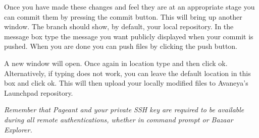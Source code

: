 Once you have made these changes and feel they are at an appropriate stage you can commit them by pressing the commit button. This will bring up another window. The branch should show, by default, your local repository. In the message box type the message you want publicly displayed when your commit is pushed. When you are done you can push files by clicking the push button.

A new window will open. Once again in location type  and then click ok. Alternatively, if typing  does not work, you can leave the default location in this box and click ok. This will then upload your locally modified files to Avaneya's Launchpad repository.

{\it Remember that Pageant and your private SSH key are required to be available during all remote authentications, whether in command prompt or Bazaar Explorer.}

